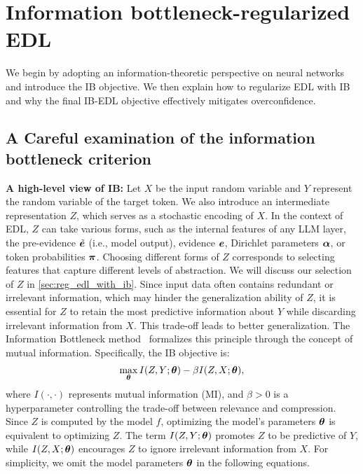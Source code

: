 \section{Information bottleneck-regularized EDL}
We begin by adopting an information-theoretic perspective on neural networks and introduce the IB objective. We then explain how to regularize EDL with IB and why the final IB-EDL objective effectively mitigates overconfidence.

\subsection{A Careful examination of the information bottleneck criterion} \label{sec:objective_ib}

\textbf{A high-level view of IB:} Let $X$ be the input random variable and $Y$ represent the random variable of the target token. We also introduce an intermediate representation $Z$, which serves as a stochastic encoding of $X$. In the context of EDL, $Z$ can take various forms, such as the internal features of any LLM layer, the pre-evidence $\tilde{\bm{e}}$ (i.e., model output), evidence $\bm{e}$, Dirichlet parameters $\bm{\alpha}$, or token probabilities $\bm{\pi}$. Choosing different forms of $Z$ corresponds to selecting features that capture different levels of abstraction. We will discuss our selection of $Z$ in \cref{sec:reg_edl_with_ib}. Since input data often contains redundant or irrelevant information, which may hinder the generalization ability of $Z$, it is essential for $Z$ to retain the most predictive information about $Y$ while discarding irrelevant information from $X$. This trade-off leads to better generalization. The Information Bottleneck method~\citep{tishby99information,tishby2015deep} formalizes this principle through the concept of mutual information. Specifically, the IB objective is: 
\begin{equation}
    \begin{aligned}
        \max_{\bm{\theta}} I(Z, Y; \bm{\theta}) - \beta I(Z, X; \bm{\theta}),
    \end{aligned}
    \label{eq:ib_objective}
\end{equation}
where $I(\cdot, \cdot)$ represents mutual information (MI), and $\beta > 0$ is a hyperparameter controlling the trade-off between relevance and compression. Since $Z$ is computed by the model $f$, optimizing the model’s parameters $\bm{\theta}$ is equivalent to optimizing $Z$. The term $I(Z, Y; \bm{\theta})$ promotes $Z$ to be predictive of $Y$, while $I(Z, X; \bm{\theta})$ encourages $Z$ to ignore irrelevant information from $X$. For simplicity, we omit the model parameters $\bm{\theta}$ in the following equations.

